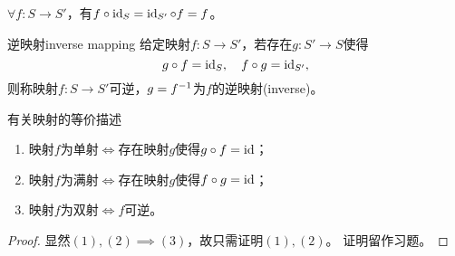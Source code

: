 \begin{corollary}
	$\forall f:S\to S'$，有$f\circ\operatorname{id}_S=\operatorname{id}_{S'}\circ f=f$。
\end{corollary}

\begin{definition}
	{逆映射}{inverse mapping}
	给定映射$f:S\to S'$，若存在$g:S'\to S$使得
	\[
		g\circ f=\operatorname{id}_S,\quad f\circ g=\operatorname{id}_{S'},
	\]
	则称映射$f:S\to S'$可逆，$g=f^{-1}$为$f$的逆映射(inverse)。
\end{definition}
\begin{theorem}{有关映射的等价描述}{}
	\begin{enumerate}
		\item 映射$f$为单射$\iff$存在映射$g$使得$g\circ f=\operatorname{id}$；
		\item 映射$f$为满射$\iff$存在映射$g$使得$f\circ g=\operatorname{id}$；
		\item 映射$f$为双射$\iff f$可逆。
	\end{enumerate}
\end{theorem}
\begin{proof}
	显然$(1),(2)\implies(3)$，故只需证明$(1),(2)$。
	证明留作习题。
	\qedhere
	
\end{proof}
